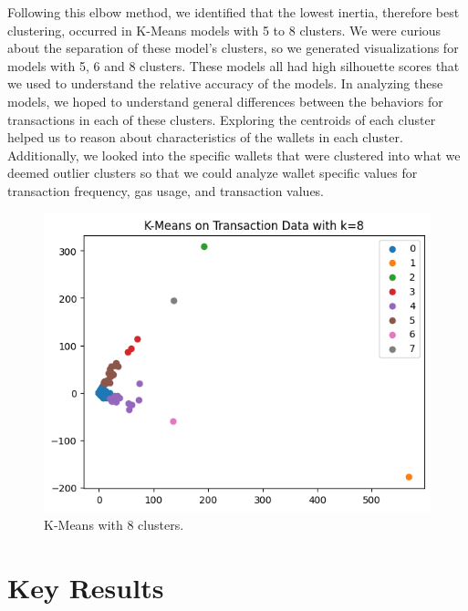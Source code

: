 \documentclass[sigconf]{acmart}
\begin{document}
Following this elbow method, we identified that the lowest inertia, therefore best clustering, occurred in K-Means models with 5 to 8 clusters. We were curious about the separation of these model’s clusters, so we generated visualizations for models with 5, 6 and 8 clusters. These models all had high silhouette scores that we used to understand the relative accuracy of the models. In analyzing these models, we hoped to understand general differences between the behaviors for transactions in each of these clusters. Exploring the centroids of each cluster helped us to reason about characteristics of the wallets in each cluster. Additionally, we looked into the specific wallets that were clustered into what we deemed outlier clusters so that we could analyze wallet specific values for transaction frequency, gas usage, and transaction values.  

\begin{figure}[H]
    \centering
    \includegraphics[width=0.8\linewidth]{M6-k-8.png}
    \caption{K-Means with 8 clusters.}
    \label{fig:k8Clusters}
\end{figure}

\section{Key Results}
\end{document}
